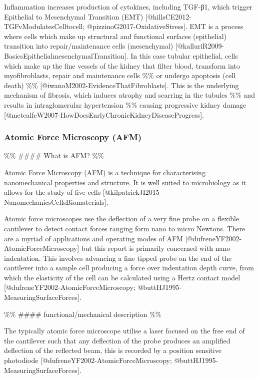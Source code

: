 \documentclass[
  paper=a4,
  ,captions=tableheading
]{scrartcl}
\begin{document}
Inflammation increases production of cytokines, including TGF-β1, which
trigger Epithelial to Mesenchymal Transition (EMT)
{[}@hillsCE2012-TGFvModulatesCelltocell;
@pizzinoG2017-OxidativeStress{]}. EMT is a process where cells which
make up structural and functional surfaces (epithelial) transition into
repair/maintenance cells (mesenchymal)
{[}@kalluriR2009-BasicsEpithelialmesenchymalTransition{]}. In this case
tubular epithelial, cells which make up the fine vessels of the kidney
that filter blood, transform into myofibroblasts, repair and maintenance
cells \%\% or undergo apoptosis (cell death) \%\%
{[}@iwanoM2002-EvidenceThatFibroblasts{]}. This is the underlying
mechanism of fibrosis, which induces atrophy and scarring in the tubules
\%\% and results in intraglomerular hypertension \%\% causing
progressive kidney damage
{[}@metcalfeW2007-HowDoesEarlyChronicKidneyDiseaseProgress{]}.

\subsubsection{Atomic Force Microscopy
(AFM)}\label{atomic-force-microscopy-afm}

\%\% \#\#\#\# What is AFM? \%\%

Atomic Force Microscopy (AFM) is a technique for characterising
nanomechanical properties and structure. It is well suited to
microbiology as it allows for the study of live cells
{[}@kilpatrickJI2015-NanomechanicsCellsBiomaterials{]}.

Atomic force microscopes use the deflection of a very fine probe on a
flexible cantilever to detect contact forces ranging form nano to micro
Newtons. There are a myriad of applications and operating modes of AFM
{[}@dufreneYF2002-AtomicForceMicroscopy{]} but this report is primarily
concerned with nano indentation. This involves advancing a fine tipped
probe on the end of the cantilever into a sample cell producing a force
over indentation depth curve, from which the elasticity of the cell can
be calculated using a Hertz contact model
{[}@dufreneYF2002-AtomicForceMicroscopy;
@buttHJ1995-MeasuringSurfaceForces{]}.

\%\% \#\#\#\# functional/mechanical description \%\%

The typically atomic force microscope utilise a laser focused on the
free end of the cantilever such that any deflection of the probe
produces an amplified deflection of the reflected beam, this is recorded
by a position sensitive photodiode
{[}@dufreneYF2002-AtomicForceMicroscopy;
@buttHJ1995-MeasuringSurfaceForces{]}.
\end{document}
